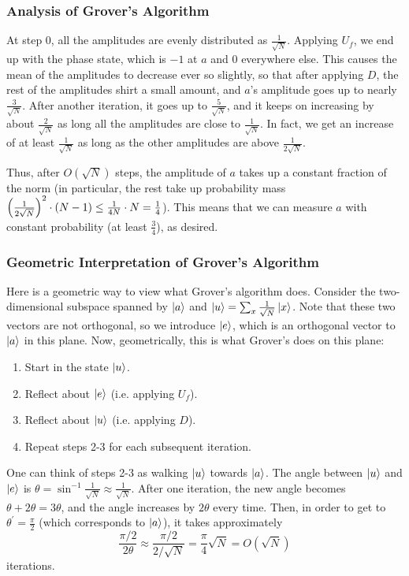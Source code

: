 \subsubsection{Analysis of Grover's Algorithm}

At step 0, all the amplitudes are evenly distributed as $\frac{1}{\sqrt{N}}$. Applying $U_f$, we end up with the phase state,
which is $-1$ at $a$ and 0 everywhere else. This causes the mean of the amplitudes to decrease ever so slightly, so that after applying $D$, the rest of the amplitudes shirt a small amount, and $a$'s amplitude goes up to nearly $\frac{3}{\sqrt{N}}$.
After another iteration, it goes up to $\frac{5}{\sqrt{N}}$, and it keeps on increasing by about $\frac{2}{\sqrt{N}}$
as long all the amplitudes are close to $\frac{1}{\sqrt{N}}$. In fact, we get an increase of at least $\frac{1}{\sqrt{N}}$ as long as the other amplitudes are above $\frac{1}{2\sqrt{N}}$. 

Thus, after $O(\sqrt{N})$
steps, the amplitude of $a$ takes up a constant fraction of the norm (in particular, the rest take up 
probability mass $\qty(\frac{1}{2\sqrt{N}})^2 \cdot (N - 1) \leq \frac{1}{4N} \cdot N = \frac{1}{4}$).
This means that we can measure $a$ with constant probability (at least $\frac{3}{4}$), as desired.

\subsubsection{Geometric Interpretation of Grover's Algorithm}
Here is a geometric way to view what Grover's algorithm does. Consider the two-dimensional subspace spanned by
$\ket{a}$ and $\ket{u} = \sum_x \frac{1}{\sqrt{N}} \ket{x}$. Note that these two vectors are not orthogonal, so we introduce $\ket e$, which is an orthogonal
vector to $\ket{a}$ in this plane. Now, geometrically, this is what Grover's does on this plane:
\begin{enumerate}
    \item Start in the state $\ket u$.
    \item Reflect about $\ket e$ (i.e. applying $U_f$).
    \item Reflect about $\ket u$ (i.e. applying $D$).
    \item Repeat steps 2-3 for each subsequent iteration.
\end{enumerate}
One can think of steps 2-3 as walking $\ket{u}$ towards $\ket{a}$. The angle between $\ket{u}$ and $\ket{e}$ is $\theta = \sin^{-1} \frac{1}{\sqrt{N}} \approx \frac{1}{\sqrt{N}}$.
After one iteration, the new angle becomes $\theta + 2 \theta = 3 \theta$, and the angle increases by $2\theta$ every time. Then, in order to get to $\theta^{\prime} = \frac{\pi}{2}$ (which corresponds to $\ket a$), it takes approximately
\[\frac{\pi /2}{2 \theta} \approx \frac{\pi / 2}{2 / \sqrt{N}} = \frac{\pi}{4} \sqrt{N} = O(\sqrt{N})\]
iterations. 


